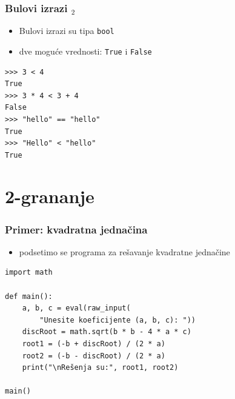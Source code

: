 \documentclass[utf8,compress]{beamer}
\begin{document}

\begin{frame}[fragile]
  \frametitle{Bulovi izrazi $_2$}
  \begin{itemize}
    \item Bulovi izrazi su tipa \texttt{bool} 
    \item dve moguće vrednosti: \texttt{True} i \texttt{False}
  \end{itemize}
\begin{verbatim}
>>> 3 < 4
True
>>> 3 * 4 < 3 + 4
False
>>> "hello" == "hello"
True
>>> "Hello" < "hello"
True
\end{verbatim}
\end{frame}

\section{2-grananje}

\begin{frame}[fragile]
  \frametitle{Primer: kvadratna jednačina}
  \begin{itemize}
    \item podsetimo se programa za rešavanje kvadratne jednačine
  \end{itemize}
\begin{verbatim}
import math

def main():
    a, b, c = eval(raw_input(
        "Unesite koeficijente (a, b, c): "))
    discRoot = math.sqrt(b * b - 4 * a * c)
    root1 = (-b + discRoot) / (2 * a)
    root2 = (-b - discRoot) / (2 * a)
    print("\nRešenja su:", root1, root2) 

main()
\end{verbatim}
\end{frame}
\end{document}
